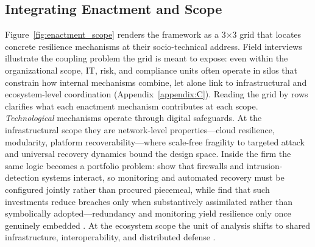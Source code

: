 \subsection{Integrating Enactment and Scope}



Figure~\ref{fig:enactment_scope} renders the framework as a 3$\times$3 grid that locates concrete resilience mechanisms at their socio-technical address. Field interviews illustrate the coupling problem the grid is meant to expose: even within the organizational scope, IT, risk, and compliance units often operate in silos that constrain how internal mechanisms combine, let alone link to infrastructural and ecosystem-level coordination (Appendix~\ref{appendix:C}). Reading the grid by rows clarifies what each enactment mechanism contributes at each scope.\\

\emph{Technological} mechanisms operate through digital safeguards. At the infrastructural scope they are network-level properties---cloud resilience, modularity, platform recoverability---where scale-free fragility to targeted attack \autocite{albert2000error} and universal recovery dynamics \autocite{gao2016universal,panteli2017metrics} bound the design space. Inside the firm the same logic becomes a portfolio problem: \textcite{cavusoglu2009configuration} show that firewalls and intrusion-detection systems interact, so monitoring and automated recovery must be configured jointly rather than procured piecemeal, while \textcite{angst2017when} find that such investments reduce breaches only when substantively assimilated rather than symbolically adopted---redundancy and monitoring yield resilience only once genuinely embedded \autocite{linkov2013resilience,bjorck2015cyber,kuypers2018designing}. At the ecosystem scope the unit of analysis shifts to shared infrastructure, interoperability, and distributed defense \autocite{dupont2019cyberresilience,lostri2022shared}.\\

